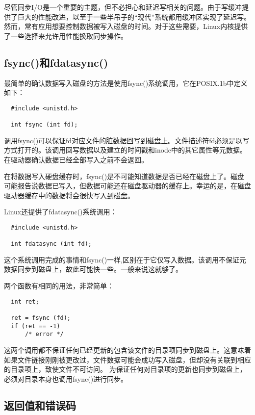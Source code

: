 尽管同步I/O是一个重要的主题，但不必担心和延迟写相关的问题。由于写缓冲提供了巨大的性能改进，以至于一些半吊子的“现代”系统都用缓冲区实现了延迟写。然而，常有应用想要控制数据被写入磁盘的时间。对于这些需要，Linux内核提供了一些选择来允许用性能换取同步操作。 

\subsection{fsync()和fdatasync()}

最简单的确认数据写入磁盘的方法是使用fsync()系统调用，它在POSIX.1b中定义如下：

\begin{lstlisting}
  #include <unistd.h>

  int fsync (int fd);
\end{lstlisting}

调用fsync()可以保证fd对应文件的脏数据回写到磁盘上。文件描述符fd必须是以写方式打开的。该调用回写数据以及建立的时间戳和inode中的其它属性等元数据。在驱动器确认数据已经全部写入之前不会返回。

在将数据写入硬盘缓存时，fsync()是不可能知道数据是否已经在磁盘上了。磁盘可能报告说数据已写入，但数据可能还在磁盘驱动器的缓存上。幸运的是，在磁盘驱动器缓存中的数据将会很快写入到磁盘。

Linux还提供了fdatasync()系统调用：

\begin{lstlisting}
  #include <unistd.h>

  int fdatasync (int fd);
\end{lstlisting}

这个系统调用完成的事情和fsync()一样,区别在于它仅写入数据。该调用不保证元数据同步到磁盘上，故此可能快一些。一般来说这就够了。

两个函数有相同的用法，非常简单： 

\begin{lstlisting}
  int ret;

  ret = fsync (fd);
  if (ret == -1)
      /* error */
\end{lstlisting}

这两个调用都不保证任何已经更新的包含该文件的目录项同步到磁盘上。这意味着如果文件链接刚刚被更改过，文件数据可能会成功写入磁盘，但却没有关联到相应的目录项上，致使文件不可访问。 为保证任何对目录项的更新也同步到磁盘上，必须对目录本身也调用fsync()进行同步。

\subsection{返回值和错误码}

